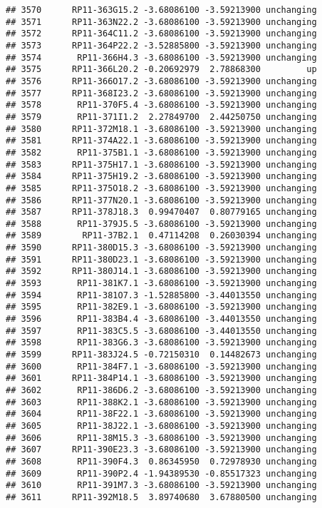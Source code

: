 \documentclass[]{article}
\begin{document}
\begin{verbatim}
## 3570      RP11-363G15.2 -3.68086100 -3.59213900 unchanging
## 3571      RP11-363N22.2 -3.68086100 -3.59213900 unchanging
## 3572      RP11-364C11.2 -3.68086100 -3.59213900 unchanging
## 3573      RP11-364P22.2 -3.52885800 -3.59213900 unchanging
## 3574       RP11-366H4.3 -3.68086100 -3.59213900 unchanging
## 3575      RP11-366L20.2 -0.20692979  2.78868300         up
## 3576      RP11-366O17.2 -3.68086100 -3.59213900 unchanging
## 3577      RP11-368I23.2 -3.68086100 -3.59213900 unchanging
## 3578       RP11-370F5.4 -3.68086100 -3.59213900 unchanging
## 3579       RP11-371I1.2  2.27849700  2.44250750 unchanging
## 3580      RP11-372M18.1 -3.68086100 -3.59213900 unchanging
## 3581      RP11-374A22.1 -3.68086100 -3.59213900 unchanging
## 3582       RP11-375B1.1 -3.68086100 -3.59213900 unchanging
## 3583      RP11-375H17.1 -3.68086100 -3.59213900 unchanging
## 3584      RP11-375H19.2 -3.68086100 -3.59213900 unchanging
## 3585      RP11-375O18.2 -3.68086100 -3.59213900 unchanging
## 3586      RP11-377N20.1 -3.68086100 -3.59213900 unchanging
## 3587      RP11-378J18.3  0.99470407  0.80779165 unchanging
## 3588       RP11-379J5.5 -3.68086100 -3.59213900 unchanging
## 3589        RP11-37B2.1  0.47114208  0.26030394 unchanging
## 3590      RP11-380D15.3 -3.68086100 -3.59213900 unchanging
## 3591      RP11-380D23.1 -3.68086100 -3.59213900 unchanging
## 3592      RP11-380J14.1 -3.68086100 -3.59213900 unchanging
## 3593       RP11-381K7.1 -3.68086100 -3.59213900 unchanging
## 3594       RP11-381O7.3 -1.52885800 -3.44013550 unchanging
## 3595       RP11-382E9.1 -3.68086100 -3.59213900 unchanging
## 3596       RP11-383B4.4 -3.68086100 -3.44013550 unchanging
## 3597       RP11-383C5.5 -3.68086100 -3.44013550 unchanging
## 3598       RP11-383G6.3 -3.68086100 -3.59213900 unchanging
## 3599      RP11-383J24.5 -0.72150310  0.14482673 unchanging
## 3600       RP11-384F7.1 -3.68086100 -3.59213900 unchanging
## 3601      RP11-384P14.1 -3.68086100 -3.59213900 unchanging
## 3602       RP11-386D6.2 -3.68086100 -3.59213900 unchanging
## 3603       RP11-388K2.1 -3.68086100 -3.59213900 unchanging
## 3604       RP11-38F22.1 -3.68086100 -3.59213900 unchanging
## 3605       RP11-38J22.1 -3.68086100 -3.59213900 unchanging
## 3606       RP11-38M15.3 -3.68086100 -3.59213900 unchanging
## 3607      RP11-390E23.3 -3.68086100 -3.59213900 unchanging
## 3608       RP11-390F4.3  0.86345950  0.72978930 unchanging
## 3609       RP11-390P2.4 -1.94389530 -0.85517323 unchanging
## 3610       RP11-391M7.3 -3.68086100 -3.59213900 unchanging
## 3611      RP11-392M18.5  3.89740680  3.67880500 unchanging

\end{verbatim}
\end{document}

